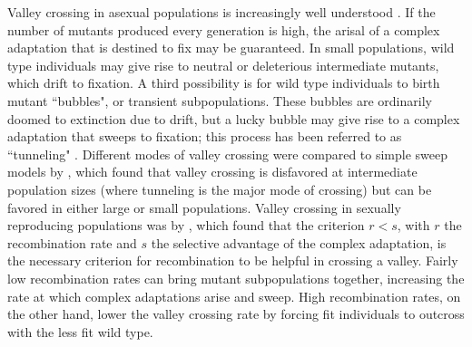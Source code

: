 \documentclass[rmp]{revtex4}
\begin{document}
Valley crossing in asexual populations is increasingly well understood \citep{weissman_2009}.
If the number of mutants produced every generation is high, the arisal of a complex adaptation that is destined to fix may be guaranteed.
In small populations, wild type individuals may give rise to neutral or deleterious intermediate mutants, which drift to fixation.
A third possibility is for wild type individuals to birth mutant ``bubbles", or transient subpopulations.
These bubbles are ordinarily doomed to extinction due to drift, but a lucky bubble may give rise to a complex adaptation that sweeps to fixation; this process has been referred to as ``tunneling" \citep{iwasa_2004, weissman_2009}.
Different modes of valley crossing were compared to simple sweep models by \citet{ochs_2015}, which found that valley crossing is disfavored at intermediate population sizes (where tunneling is the major mode of crossing) but can be favored in either large or small populations.
Valley crossing in sexually reproducing populations was by \citet{weissman_2010}, which found that the criterion $r < s$, with $r$ the recombination rate and $s$ the selective advantage of the complex adaptation, is the necessary criterion for recombination to be helpful in crossing a valley.
Fairly low recombination rates can bring mutant subpopulations together, increasing the rate at which complex adaptations arise and sweep.
High recombination rates, on the other hand, lower the valley crossing rate by forcing fit individuals to outcross with the less fit wild type.
\end{document}
